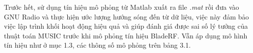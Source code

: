 Trước hết, sử dụng tín hiệu mô phỏng từ Matlab xuất ra file \textit{.mat} rồi đưa vào GNU Radio và thực hiện ước lượng hướng sóng đến từ dữ liệu, việc này đảm bảo việc lập trình khối hoạt động hiệu quả và giúp đánh giá được sai số lý tưởng của thuật toán MUSIC trước khi mô phỏng tín hiệu BladeRF. Vẫn áp dụng mô hình tín hiệu như ở mục 1.3, các thông số mô phỏng trên bảng 3.1.
